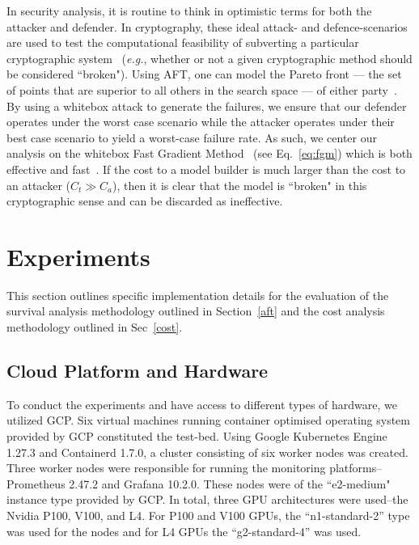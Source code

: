 \documentclass[conference]{IEEEtran}
\begin{document}
In security analysis, it is  routine to think in optimistic terms for both the attacker and defender. In cryptography, these ideal attack- and defence-scenarios are used to test the computational feasibility of subverting a particular cryptographic system~\cite{kamal2017study,leurent2020sha} (\textit{e.g.}, whether or not a given cryptographic method should be considered ``broken"). 
Using AFT, one can model the Pareto front --- the set of points that are superior to all others in the search space --- of either party~\cite{zitzler2008quality}. By using a whitebox attack to generate the failures, we ensure that our defender operates under the worst case scenario while the attacker operates under their best case scenario to yield a worst-case failure rate.
As such, we center our analysis on the whitebox Fast Gradient Method~\cite{fgm} (see Eq.~\ref{eq:fgm}) which is both effective and fast~\cite{meyers}. If the cost to a model builder is much larger than the cost to an attacker ($C_t \gg C_a$), then it is  clear that the model is ``broken" in this cryptographic sense and can be discarded as ineffective. 


\section{Experiments}
\label{experiments}

This section outlines specific implementation details for the evaluation of the survival analysis methodology outlined in Section~\ref{aft} and the cost analysis methodology outlined in Sec~\ref{cost}.


\subsection{Cloud Platform and Hardware}
To conduct the experiments and have access to different types of hardware, we utilized GCP. Six virtual machines running container optimised operating system provided by GCP constituted the test-bed. Using Google Kubernetes Engine 1.27.3 and Containerd 1.7.0, a cluster consisting of six worker nodes was created. Three worker nodes were responsible for running the monitoring platforms-- Prometheus 2.47.2 and Grafana 10.2.0. These nodes were of the ``e2-medium" instance type provided by GCP. In total, three GPU architectures were used--the Nvidia P100, V100, and L4. For P100 and V100 GPUs, the ``n1-standard-2'' type was used for the nodes and for L4 GPUs the ``g2-standard-4'' was used.
\end{document}
